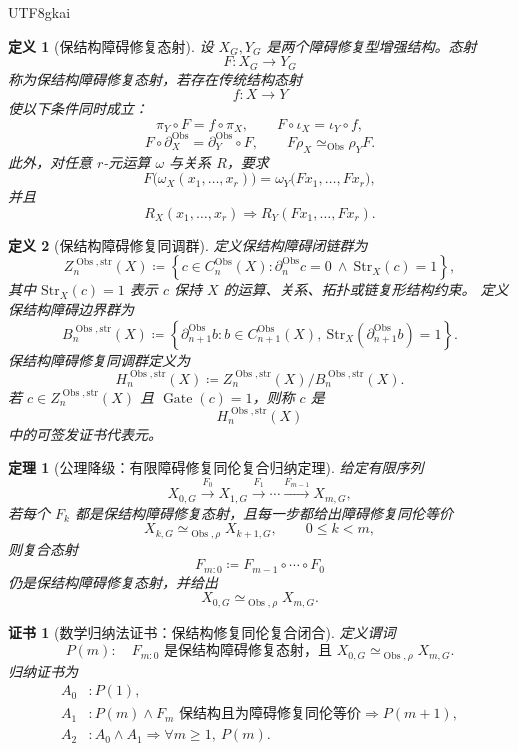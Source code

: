 \documentclass[12pt]{article}
\newtheorem{definition}{定义}[section]
\newtheorem{theorem}{定理}[section]
\newtheorem{Certificate}{证书}[section]
\newcommand{\DefEq}{\coloneqq}
\DeclareMathOperator{\Gate}{Gate}
\DeclareMathOperator{\Obs}{Obs}
\begin{document}
\begin{CJK*}{UTF8}{gkai}
\begin{definition}[保结构障碍修复态射]
\label{def:tex59-structure-preserving-repair-morphism}
设 \(X_G,Y_G\) 是两个障碍修复型增强结构。态射
\[
  F:X_G\longrightarrow Y_G
\]
称为保结构障碍修复态射，若存在传统结构态射
\[
  f:X\longrightarrow Y
\]
使以下条件同时成立：
\[
  \pi_Y\circ F=f\circ\pi_X,
  \qquad
  F\circ\iota_X=\iota_Y\circ f,
\]
\[
  F\circ\partial_X^{\Obs}
  =
  \partial_Y^{\Obs}\circ F,
  \qquad
  F\rho_X\simeq_{\Obs}\rho_YF.
\]
此外，对任意 \(r\)-元运算 \(\omega\) 与关系 \(R\)，要求
\[
  F\bigl(\omega_X(x_1,\ldots,x_r)\bigr)
  =
  \omega_Y\bigl(Fx_1,\ldots,Fx_r\bigr),
\]
并且
\[
  R_X(x_1,\ldots,x_r)
  \Rightarrow
  R_Y(Fx_1,\ldots,Fx_r).
\]
\end{definition}

\begin{definition}[保结构障碍修复同调群]
\label{def:tex59-structure-preserving-obstruction-homology}
定义保结构障碍闭链群为
\[
  Z_n^{\Obs,\mathrm{str}}(X)
  \DefEq
  \left\{
  c\in C_n^{\Obs}(X):
  \partial_n^{\Obs}c=0
  \ \wedge\
  \mathrm{Str}_X(c)=1
  \right\},
\]
其中 \(\mathrm{Str}_X(c)=1\) 表示 \(c\) 保持 \(X\) 的运算、关系、拓扑或链复形结构约束。
定义保结构障碍边界群为
\[
  B_n^{\Obs,\mathrm{str}}(X)
  \DefEq
  \left\{
  \partial_{n+1}^{\Obs}b:
  b\in C_{n+1}^{\Obs}(X),
  \ \mathrm{Str}_X(\partial_{n+1}^{\Obs}b)=1
  \right\}.
\]
保结构障碍修复同调群定义为
\[
  H_n^{\Obs,\mathrm{str}}(X)
  \DefEq
  Z_n^{\Obs,\mathrm{str}}(X)
  \big/
  B_n^{\Obs,\mathrm{str}}(X).
\]
若 \(c\in Z_n^{\Obs,\mathrm{str}}(X)\) 且 \(\Gate(c)=1\)，则称 \(c\) 是
\[
  H_n^{\Obs,\mathrm{str}}(X)
\]
中的可签发证书代表元。
\end{definition}

\begin{theorem}[公理降级：有限障碍修复同伦复合归纳定理]
\label{thm:tex59-repair-homotopy-composition-induction}
给定有限序列
\[
  X_{0,G}\xrightarrow{F_0}X_{1,G}
  \xrightarrow{F_1}\cdots
  \xrightarrow{F_{m-1}}X_{m,G},
\]
若每个 \(F_k\) 都是保结构障碍修复态射，且每一步都给出障碍修复同伦等价
\[
  X_{k,G}\simeq_{\Obs,\rho}X_{k+1,G},
  \qquad 0\le k<m,
\]
则复合态射
\[
  F_{m:0}\DefEq F_{m-1}\circ\cdots\circ F_0
\]
仍是保结构障碍修复态射，并给出
\[
  X_{0,G}\simeq_{\Obs,\rho}X_{m,G}.
\]
\end{theorem}

\begin{Certificate}[数学归纳法证书：保结构修复同伦复合闭合]
\label{cert:tex59-repair-homotopy-composition-induction}
定义谓词
\[
  P(m):\quad
  F_{m:0}\text{ 是保结构障碍修复态射，且 }
  X_{0,G}\simeq_{\Obs,\rho}X_{m,G}.
\]
归纳证书为
\[
\begin{aligned}
  A_0 &: P(1),\\
  A_1 &: P(m)\wedge F_m\text{ 保结构且为障碍修复同伦等价}
         \Rightarrow P(m+1),\\
  A_2 &: A_0\wedge A_1
         \Rightarrow
         \forall m\ge1,\ P(m).
\end{aligned}
\]
\end{Certificate}


\end{CJK*}
\end{document}
